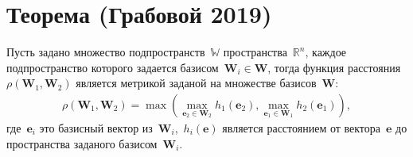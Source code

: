 \newpage

\appendix
\setcounter{theorem}{0}
\section{Теорема (Грабовой 2019)}\label{ProofTheorem1}
\begin{theorem}\label{th:1} 
Пусть задано множество подпространств~$\mathbb{W}$ пространства~$\mathbb{R}^{n}$, каждое подпространство которого задается базисом~$\mathbf{W}_i\in \mathbf{W}$, тогда функция расстояния~$\rho\left(\textbf{W}_1, \textbf{W}_2\right)$ является метрикой заданой на множестве базисов~$\mathbf{W}$:
\begin{equation}
\label{eq:th2:1}
\begin{aligned}
\rho\left(\textbf{W}_1, \textbf{W}_2\right) = \max\left(\max_{\textbf{e}_2 \in \textbf{W}_2} h_{1}\left(\textbf{e}_2\right), \max_{\textbf{e}_1 \in \textbf{W}_1} h_{2}\left(\textbf{e}_1\right)\right),
\end{aligned}
\end{equation}
где~$\textbf{e}_i$ это базисный вектор из~$\textbf{W}_i$,~$h_i\left(\textbf{e}\right)$ является расстоянием от вектора~$\textbf{e}$ до пространства заданого базисом~$\textbf{W}_i$.
\end{theorem}
